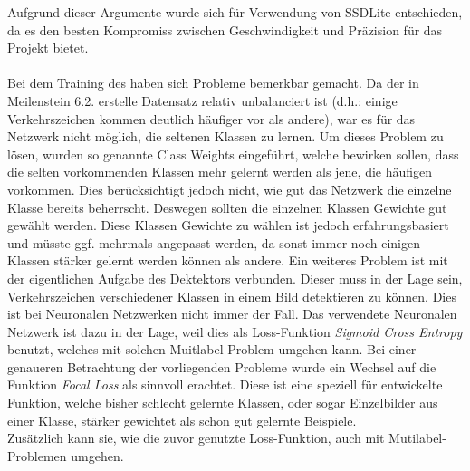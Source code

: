 \documentclass[12pt,a4paper,ngerman,enabledeprecatedfontcommands]{scrreprt}
\begin{document}
Aufgrund dieser Argumente wurde sich für Verwendung von SSDLite\cite{DBLP:journals/corr/abs-1801-04381} entschieden, da es den besten Kompromiss zwischen Geschwindigkeit und Präzision für das Projekt bietet.\\
\\
Bei dem Training des  haben sich Probleme bemerkbar gemacht. Da der in Meilenstein 6.2. erstelle Datensatz relativ unbalanciert ist (d.h.: einige Verkehrszeichen kommen deutlich häufiger vor als andere), war es für das Netzwerk nicht möglich, die seltenen Klassen zu lernen. Um dieses Problem zu lösen, wurden so genannte \glqq{}Class Weights\grqq{} eingeführt, welche bewirken sollen, dass die selten vorkommenden Klassen mehr gelernt werden als jene, die häufigen vorkommen. Dies berücksichtigt jedoch nicht, wie gut das Netzwerk die einzelne Klasse bereits beherrscht.
Deswegen sollten die einzelnen Klassen Gewichte gut gewählt werden.
Diese Klassen Gewichte zu wählen ist jedoch erfahrungsbasiert und müsste ggf. mehrmals angepasst werden, da sonst immer noch einigen Klassen stärker gelernt werden können als andere.
Ein weiteres Problem ist mit der eigentlichen Aufgabe des Dektektors verbunden. Dieser muss in der Lage sein, Verkehrszeichen verschiedener Klassen in einem Bild detektieren zu können. Dies ist bei Neuronalen Netzwerken nicht immer der Fall. Das verwendete Neuronalen Netzwerk ist dazu in der Lage, weil dies als Loss-Funktion 
\textit{\glqq{}Sigmoid Cross Entropy\grqq{}} benutzt, welches mit solchen \glqq{}Muitlabel\grqq{}-Problem umgehen kann. Bei einer genaueren Betrachtung der vorliegenden Probleme wurde ein Wechsel auf die Funktion \textit{\glqq{}Focal Loss\grqq{}}\cite{DBLP:journals/corr/abs-1708-02002} als sinnvoll erachtet. Diese ist eine speziell für  entwickelte Funktion, welche bisher schlecht gelernte Klassen, oder sogar Einzelbilder aus einer Klasse, stärker gewichtet als schon gut gelernte Beispiele.\\
Zusätzlich kann sie, wie die zuvor genutzte Loss-Funktion, auch mit \glqq{}Mutilabel\grqq{}-Problemen umgehen.
\end{document}
